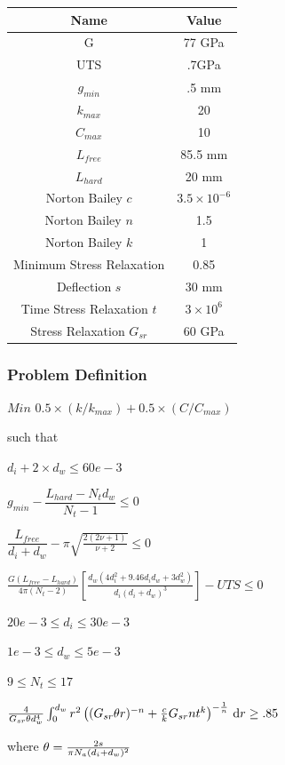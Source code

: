 \documentclass[10pt]{article}
\begin{document}
\begin{center}
	 \begin{tabular}{| c  | c |  }
	 	\hline Name & Value\\
	 	\hline G & 77 GPa \\
		\hline UTS & .7GPa \\
		\hline $g_{min}$ & .5 mm\\ 
	 	\hline $k_{max}$ & 20\\
		\hline $C_{max}$ & 10\\
		\hline $L_{free}$ & 85.5 mm\\
		\hline $L_{hard}$ & 20 mm\\
		\hline Norton Bailey $c$& $ 3.5 \times 10^{-6}$ \\
		\hline Norton Bailey $n$ & 1.5\\
		\hline Norton Bailey $k$ & 1 \\
		\hline Minimum Stress Relaxation & 0.85\\
		\hline Deflection $s$ & 30 mm\\
		\hline Time Stress Relaxation $t$  & $3 \times 10^{6}$\\
		\hline Stress Relaxation $G_{sr}$ & 60 GPa\\
		\hline
	 \end{tabular}
\end{center}

	\subsubsection{Problem Definition}
	
	\centerline{$Min$ \hspace{2 mm}$0.5 \times(k/k_{max}) + 0.5 \times (C/C_{max})$}
	\begin{center}such that \end{center}
	\centerline{$d_{i} + 2 \times d_{w} \leq 60e-3$}
	\centerline{$g_{min} - \dfrac{L_{hard} - N_{t}d_{w}}{N_{t}-1} \leq 0$}
	\centerline{$\dfrac{L_{free}}{d_{i} + d_{w}} - \pi \sqrt{\frac{2(2 \nu + 1)}{\nu + 2}} \leq 0$}
	\centerline{$\frac{G(L_{free} - L_{hard})}{4 \pi (N_{t} - 2) } \left[\frac{d_{w} (4d_{i}^{2} + 9.46d_{i} 
d_{w} + 3 d_{w}^{2})}{d_{i}(d_{i}+d_{w})^{3}}\right] - UTS \leq 0$}
    \centerline{$20e-3 \leq d_{i} \leq 30e-3$}
    \centerline{$1e-3 \leq d_{w} \leq 5e-3$}
    \centerline{$9 \leq N_{t} \leq 17$}
    
 \centerline{${4\over G_{sr}\theta d_w^4}\int_0^{d_w} r^2 \left( (G_{sr}\theta r)^{-n} + {c\over k} G_{sr}nt^k \right)^{-{1\over n}} \,\mathrm{d} r \ge .85$}
\begin{center} where $\theta = {2s\over \pi N_a (d_i+d_w)^2}$ \end{center}
\newpage
\end{document}
